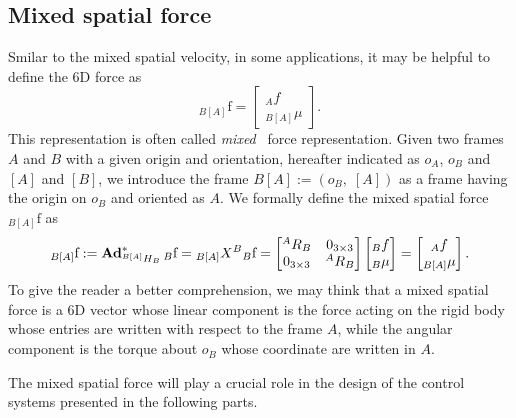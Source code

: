 \subsection{Mixed spatial force}
Smilar to the mixed spatial velocity, in some applications, it may be helpful to define the 6D force as
\begin{equation}
{}_{B[A]} \mathrm{f} = 
    \begin{bmatrix}
      {}_A f \\
      {}_{B[A]}\mu
    \end{bmatrix}.
\end{equation} 
This representation is often called \emph{mixed}~\citep[Chapter~2.3]{traversaro2017} force representation.
Given two frames $A$ and $B$ with a given origin and orientation, hereafter indicated as $o_A$, $o_B$ and $[A]$ and $[B]$, we introduce the frame $B[A]:=(o_B, \; [A])$ as a frame having the origin on $o_B$ and oriented as $A$. We formally define the mixed spatial force ${}_{B[A]}\mathrm{f}$ as 
\begin{equation}
\label{eq:mixed_force_definition}
    {}_{B[A]}\mathrm{f} := \operatorname{\mathbf{Ad}}^*_{{}^{B[A]} H _B} {}_B \mathrm{f} =  {}_{B[A]} X ^B {}_B \mathrm{f} = 
    \begin{bmatrix}
       {}^A R _B & 0_{3\times3} \\
       0_{3\times3} & {}^A R _B
    \end{bmatrix}
    \begin{bmatrix}
       {}_B f\\
       {}_{B}\mu
    \end{bmatrix} = 
    \begin{bmatrix}
     {}_A f \\
     {}_{B[A]}\mu
    \end{bmatrix}.
\end{equation}
To give the reader a better comprehension, we may think that a mixed spatial force is a 6D vector whose linear component is the force acting on the rigid body whose entries are written with respect to the frame $A$, while the angular component is the torque about $o_B$ whose coordinate are written in $A$. 
\par
The mixed spatial force will play a crucial role in the design of the control systems presented in the following parts.



